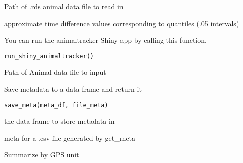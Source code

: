 \documentclass[a4paper]{book}
\begin{document}
%
\begin{Arguments}
\begin{ldescription}
\item[\code{rds\_path}] Path of .rds animal data file to read in
\end{ldescription}
\end{Arguments}
%
\begin{Value}
approximate time difference values corresponding to quantiles (.05 intervals)
\end{Value}
%
\begin{Description}\relax
You can run the animaltracker Shiny app by calling this function.
\end{Description}
%
\begin{Usage}
\begin{verbatim}
run_shiny_animaltracker()
\end{verbatim}
\end{Usage}
%
\begin{Arguments}
\begin{ldescription}
\item[\code{rds\_path}] Path of Animal data file to input
\end{ldescription}
\end{Arguments}
%
\begin{Description}\relax
Save metadata to a data frame and return it
\end{Description}
%
\begin{Usage}
\begin{verbatim}
save_meta(meta_df, file_meta)
\end{verbatim}
\end{Usage}
%
\begin{Arguments}
\begin{ldescription}
\item[\code{meta\_df}] the data frame to store metadata in

\item[\code{file\_meta}] meta for a .csv file generated by get\_meta
\end{ldescription}
\end{Arguments}
%
\begin{Description}\relax
Summarize by GPS unit
\end{Description}
\end{document}
